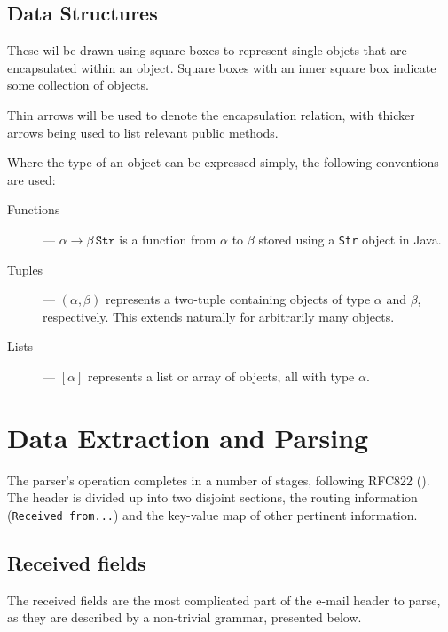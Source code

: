 \subsection{Data Structures}
These wil be drawn using square boxes to represent single objets that are encapsulated
within an object.  Square boxes with an inner square box indicate some collection
of objects.

Thin arrows will be used to denote the encapsulation relation, with thicker
arrows being used to list relevant public methods.

Where the type of an object can be expressed simply, the following conventions are used:
\begin{description}
	\item [Functions] --- $\alpha \rightarrow \beta \, \texttt{Str}$ is a function from $\alpha$ to $\beta$ stored using a \texttt{Str} object in Java.
	\item [Tuples] --- $(\alpha, \beta)$ represents a two-tuple containing objects of type $\alpha$ and $\beta$, respectively.  This extends naturally for arbitrarily many objects.
	\item [Lists] --- $[\alpha]$ represents a list or array of objects, all with type $\alpha$.
\end{description}

\section{Data Extraction and Parsing}

The parser's operation completes in a number of stages, following RFC822
(\cite{RFC0822}).  The header is divided up into two disjoint sections, the
routing information (\texttt{Received from...}) and the key-value map of other
pertinent information.

\subsection{Received fields}\label{sec:par}

The received fields are the most complicated part of the e-mail header to parse,
as they are described by a non-trivial grammar, presented below.

